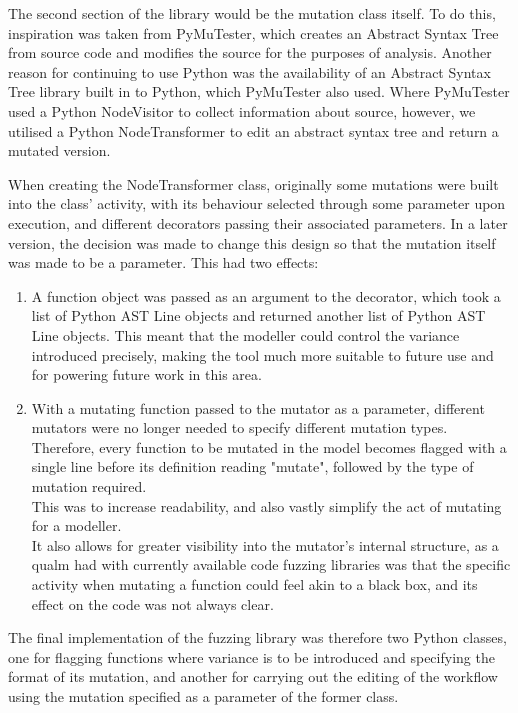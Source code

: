 The second section of the library would be the mutation class itself. To do this, inspiration was taken from PyMuTester\cite{GitHu12:online}, which creates an Abstract Syntax Tree from source code and modifies the source for the purposes of analysis. Another reason for continuing to use Python was the availability of an Abstract Syntax Tree library built in to Python\cite{32.2.7:online}, which PyMuTester also used. Where PyMuTester used a Python NodeVisitor to collect information about source, however, we utilised a Python NodeTransformer to edit an abstract syntax tree and return a mutated version. \par

When creating the NodeTransformer class, originally some mutations were built into the class' activity, with its behaviour selected through some parameter upon execution, and different decorators passing their associated parameters. In a later version, the decision was made to change this design so that the mutation itself was made to be a parameter. This had two effects: 

\begin{enumerate}
    \item A function object was passed as an argument to the decorator, which took a list of Python AST Line objects and returned another list of Python AST Line objects. This meant that the modeller could control the variance introduced precisely, making the tool much more suitable to future use and for powering future work in this area.
    \item With a mutating function passed to the mutator as a parameter, different mutators were no longer needed to specify different mutation types. Therefore, every function to be mutated in the model becomes flagged with a single line before its definition reading "mutate", followed by the type of mutation required.\\
    This was to increase readability, and also vastly simplify the act of mutating for a modeller.\\
    It also allows for greater visibility into the mutator's internal structure, as a qualm had with currently available code fuzzing libraries was that the specific activity when mutating a function could feel akin to a black box, and its effect on the code was not always clear.
\end{enumerate}\par

The final implementation of the fuzzing library was therefore two Python classes, one for flagging functions where variance is to be introduced and specifying the format of its mutation, and another for carrying out the editing of the workflow using the mutation specified as a parameter of the former class.\par


